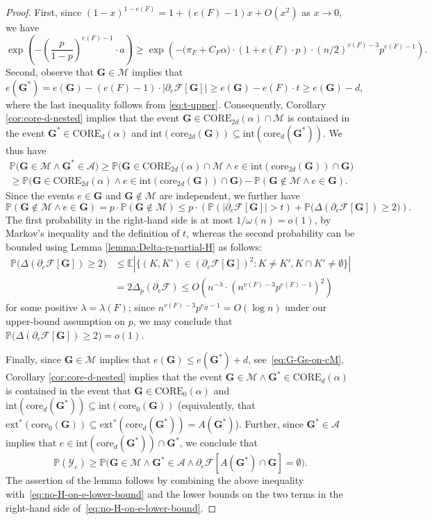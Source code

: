 \documentclass[11pt,a4paper,oneside,reqno]{amsart}
\newcommand{\bG}{\mathbf{G}}
\newcommand{\bGs}{\mathbf{G^*}}
\newcommand{\cA}{\mathcal{A}}
\newcommand{\cF}{\mathcal{F}}
\newcommand{\cM}{\mathcal{M}}
\newcommand{\cY}{\mathcal{Y}}
\renewcommand{\Pr}{\mathbb{P}}
\newcommand{\Ex}{\mathbb{E}}
\newcommand{\1}{\mathbbm{1}} %
\renewcommand{\le}{\leqslant}
\renewcommand{\ge}{\geqslant}
\newcommand{\ext}{\mathrm{ext}}
\renewcommand{\int}{\mathrm{int}}
\newcommand{\core}{\mathrm{core}}
\newcommand{\Core}{\mathrm{CORE}}
\begin{document}
\begin{proof}
  First, since $(1-x)^{1-e(F)} = 1 + (e(F)-1)x + O(x^2)$ as $x \to 0$, we have
  \[
    \exp\left(-\left(\frac{p}{1-p}\right)^{e(F)-1} \cdot a\right) \ge \exp\left(- \big(\pi_F + C_F\alpha\big) \cdot (1+e(F) \cdot p) \cdot (n/2)^{v(F)-3} p^{e(F)-1}\right).
  \]
  Second, observe that $\bG \in \cM$ implies that
  \begin{equation}
    \label{eq:G-Gs-on-cM}
    e(\bGs) = e(\bG) - (e(F)-1) \cdot |\partial_e\cF[\bG]| \ge e(\bG) - e(F) \cdot t \ge e(\bG) - d,
  \end{equation}
  where the last inequality follows from \eqref{eq:t-upper}.
  Consequently, Corollary \ref{cor:core-d-nested} implies that the event $\bG \in \Core_{2d}(\alpha) \cap \cM$ is contained in the event $\bGs \in \Core_{d}(\alpha)$ and $\int(\core_{2d}(\bG)) \subseteq \int(\core_d(\bGs))$.  We thus have
  \begin{multline*}
    \Pr\big(\bG \in \cM \wedge \bGs \in \cA\big) \ge \Pr\big(\bG \in \Core_{2d}(\alpha) \cap \cM \wedge e \in \int(\core_{2d}(\bG)) \cap \bG\big) \\
    \ge \Pr\big(\bG \in \Core_{2d}(\alpha) \wedge e \in \int(\core_{2d}(\bG)) \cap \bG\big) - \Pr(\bG \notin \cM \wedge e \in \bG).
  \end{multline*}
  Since the events $e \in \bG$ and $\bG \notin \cM$ are independent, we further have
  \[
    \Pr(\bG \notin \cM \wedge e \in \bG) = p \cdot \Pr(\bG \notin \cM) \le p \cdot \left( \Pr(|\partial_e \cF[\bG]| > t) + \Pr\big(\Delta(\partial_e\cF[\bG]) \ge 2\big)\right).
  \]
  The first probability in the right-hand side is at most $1/\omega(n) = o(1)$, by Markov's inequality and the definition of $t$, whereas the second probability can be bounded using Lemma \ref{lemma:Delta-p-partial-H} as follows:
  \[
    \begin{split}
      \Pr\big(\Delta(\partial_e\cF[\bG]) \ge 2\big) & \le \Ex|\{(K,K') \in (\partial_e\cF[\bG])^2 : K \neq K', K \cap K' \neq \emptyset\}| \\
      & = 2\Delta_p(\partial_e \cF) \le O\left(n^{-\lambda} \cdot \left(n^{v(F)-3}p^{e(F)-1}\right)^2\right)
    \end{split}
  \]
  for some positive $\lambda = \lambda(F)$;  since $n^{v(F)-3}p^{e_H-1} = O(\log n)$ under our upper-bound assumption on $p$, we may conclude that $\Pr\big(\Delta(\partial_e\cF[\bG]) \ge 2\big) = o(1)$.
  
  Finally, since $\bG \in \cM$ implies that $e(\bG) \le e(\bGs) + d$, see~\eqref{eq:G-Gs-on-cM}, Corollary \ref{cor:core-d-nested} implies that the event  $\bG \in \cM \wedge \bGs \in \Core_{d}(\alpha)$ is contained in the event that $\bG \in \Core_{0}(\alpha)$ and $\int(\core_d(\bGs)) \subseteq \int(\core_0(\bG))$ (equivalently, that $\ext^*(\core_0(\bG)) \subseteq \ext^*(\core_d(\bGs)) = A(\bGs)$).  Further, since $\bGs \in \cA$ implies that $e \in \int(\core_d(\bGs)) \cap \bGs$, we conclude that
  \[
    \Pr(\cY_e) \ge \Pr\big(\bG \in \cM \wedge \bGs \in \cA \wedge \partial_e\cF[A(\bGs) \cap \bG] = \emptyset\big).
  \]
  The assertion of the lemma follows by combining the above inequality with~\eqref{eq:no-H-on-e-lower-bound} and the lower bounds on the two terms in the right-hand side of~\eqref{eq:no-H-on-e-lower-bound}.
\end{proof}
\end{document}
